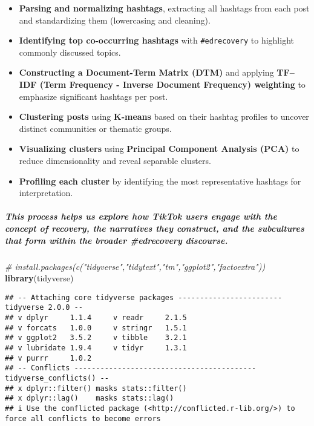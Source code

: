 \documentclass[
]{article}
\newenvironment{Shaded}{\begin{snugshade}}{\end{snugshade}}
\newcommand{\CommentTok}[1]{\textcolor[rgb]{0.56,0.35,0.01}{\textit{#1}}}
\newcommand{\FunctionTok}[1]{\textcolor[rgb]{0.13,0.29,0.53}{\textbf{#1}}}
\newcommand{\NormalTok}[1]{#1}
\begin{document}
\begin{itemize}
\item
  \textbf{Parsing and normalizing hashtags}, extracting all hashtags
  from each post and standardizing them (lowercasing and cleaning).
\item
  \textbf{Identifying top co-occurring hashtags} with
  \texttt{\#edrecovery} to highlight commonly discussed topics.
\item
  \textbf{Constructing a Document-Term Matrix (DTM)} and applying
  \textbf{TF--IDF (Term Frequency - Inverse Document Frequency)
  weighting} to emphasize significant hashtags per post.
\item
  \textbf{Clustering posts} using \textbf{K-means} based on their
  hashtag profiles to uncover distinct communities or thematic groups.
\item
  \textbf{Visualizing clusters} using \textbf{Principal Component
  Analysis (PCA)} to reduce dimensionality and reveal separable
  clusters.
\item
  \textbf{Profiling each cluster} by identifying the most representative
  hashtags for interpretation.
\end{itemize}

\subparagraph{This process helps us explore how TikTok users engage with
the concept of recovery, the narratives they construct, and the
subcultures that form within the broader \#edrecovery
discourse.}\label{this-process-helps-us-explore-how-tiktok-users-engage-with-the-concept-of-recovery-the-narratives-they-construct-and-the-subcultures-that-form-within-the-broader-edrecovery-discourse.}

\begin{Shaded}
\begin{Highlighting}[]
\CommentTok{\# install.packages(c("tidyverse","tidytext","tm","ggplot2","factoextra"))}
\FunctionTok{library}\NormalTok{(tidyverse)}
\end{Highlighting}
\end{Shaded}

\begin{verbatim}
## -- Attaching core tidyverse packages ------------------------ tidyverse 2.0.0 --
## v dplyr     1.1.4     v readr     2.1.5
## v forcats   1.0.0     v stringr   1.5.1
## v ggplot2   3.5.2     v tibble    3.2.1
## v lubridate 1.9.4     v tidyr     1.3.1
## v purrr     1.0.2     
## -- Conflicts ------------------------------------------ tidyverse_conflicts() --
## x dplyr::filter() masks stats::filter()
## x dplyr::lag()    masks stats::lag()
## i Use the conflicted package (<http://conflicted.r-lib.org/>) to force all conflicts to become errors
\end{verbatim}
\end{document}

